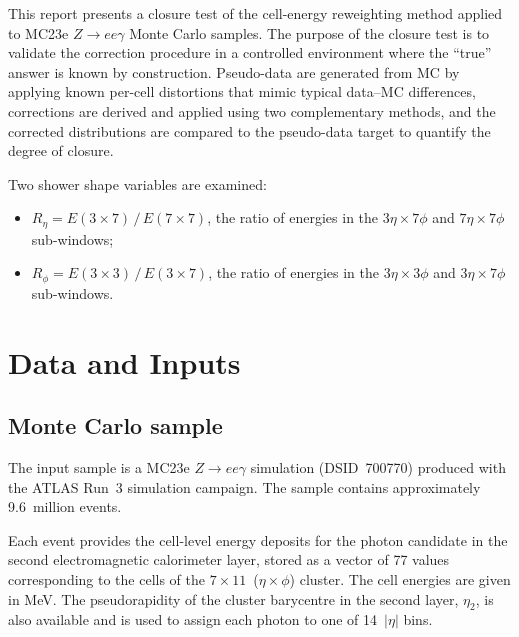 \documentclass[12pt,a4paper]{article}
\begin{document}
This report presents a closure test of the cell-energy reweighting method
applied to MC23e $Z\to ee\gamma$ Monte Carlo samples. The purpose of the
closure test is to validate the correction procedure in a controlled
environment where the ``true'' answer is known by construction. Pseudo-data
are generated from MC by applying known per-cell distortions that mimic
typical data--MC differences, corrections are derived and applied using two
complementary methods, and the corrected distributions are compared to the
pseudo-data target to quantify the degree of closure.

Two shower shape variables are examined:
\begin{itemize}
  \item $R_\eta = E(3\times7)\,/\,E(7\times7)$, the ratio of energies in
        the $3\eta\times 7\phi$ and $7\eta\times 7\phi$ sub-windows;
  \item $R_\phi = E(3\times3)\,/\,E(3\times7)$, the ratio of energies in
        the $3\eta\times 3\phi$ and $3\eta\times 7\phi$ sub-windows.
\end{itemize}

\section{Data and Inputs}
\label{sec:data}

\subsection{Monte Carlo sample}
\label{sec:data:mc}

The input sample is a MC23e $Z\to ee\gamma$ simulation (DSID~700770)
produced with the ATLAS Run~3 simulation campaign. The sample contains
approximately 9.6~million events.

Each event provides the cell-level energy deposits for the photon candidate
in the second electromagnetic calorimeter layer, stored as a vector of 77
values corresponding to the cells of the $7\times 11$~($\eta\times\phi$)
cluster. The cell energies are given in MeV. The pseudorapidity of the
cluster barycentre in the second layer, $\eta_2$, is also available and is
used to assign each photon to one of 14~$|\eta|$ bins.

\end{document}
